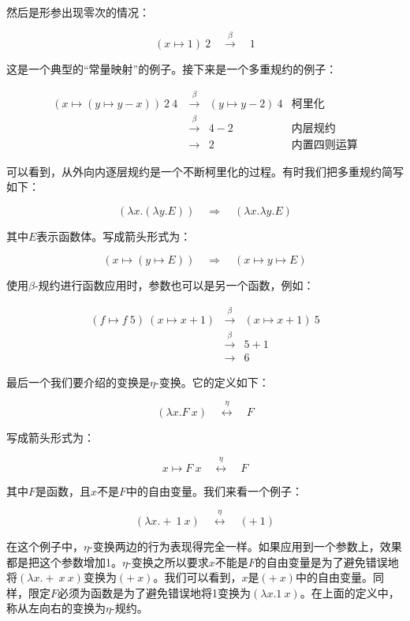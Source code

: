 \documentclass[b5paper]{ctexart}
\begin{document}
然后是形参出现零次的情况：

\[
(x \mapsto 1)\ 2 \quad \overset{\beta}{\longrightarrow} \quad 1
\]

这是一个典型的“常量映射”的例子。接下来是一个多重规约的例子：

\[
\begin{array}{rcll}
(x \mapsto (y \mapsto y - x))\ 2\ 4\ & \overset{\beta}{\longrightarrow} & (y \mapsto y - 2)\ 4 & \text{柯里化} \\
                                     & \overset{\beta}{\longrightarrow} & 4 - 2 & \text{内层规约} \\
                                     & \longrightarrow & 2 & \text{内置四则运算}
\end{array}
\]

可以看到，从外向内逐层规约是一个不断柯里化的过程。有时我们把多重规约简写如下：

\[
(\lambda x . (\lambda y . E)) \quad \Rightarrow \quad (\lambda x . \lambda y . E)
\]

其中$E$表示函数体。写成箭头形式为：

\[
(x \mapsto (y \mapsto E)) \quad \Rightarrow \quad (x \mapsto y \mapsto E)
\]

使用$\beta$-规约进行函数应用时，参数也可以是另一个函数，例如：

\[
\begin{array}{rcl}
(f \mapsto f\ 5)\ (x \mapsto x + 1) & \overset{\beta}{\longrightarrow} & (x \mapsto x + 1)\ 5 \\
                                    & \overset{\beta}{\longrightarrow} & 5 + 1 \\
                                    & \longrightarrow & 6
\end{array}
\]

最后一个我们要介绍的变换是$\eta$-变换。它的定义如下：

\[
(\lambda x . F\ x) \quad \overset{\eta}{\longleftrightarrow} \quad F
\]

写成箭头形式为：

\[
x \mapsto F\ x \quad \overset{\eta}{\longleftrightarrow} \quad F
\]

其中$F$是函数，且$x$不是$F$中的自由变量。我们来看一个例子：

\[
(\lambda x . +\ 1\ x) \quad \overset{\eta}{\longleftrightarrow} \quad (+\ 1)
\]

在这个例子中，$\eta$-变换两边的行为表现得完全一样。如果应用到一个参数上，效果都是把这个参数增加1。$\eta$-变换之所以要求$x$不能是$F$的自由变量是为了避免错误地将$(\lambda x. +\ x\ x)$变换为$(+\ x)$。我们可以看到，$x$是$(+\ x)$中的自由变量。同样，限定$F$必须为函数是为了避免错误地将1变换为$(\lambda x . 1\ x)$。在上面的定义中，称从左向右的变换为$\eta$-规约。
\end{document}

